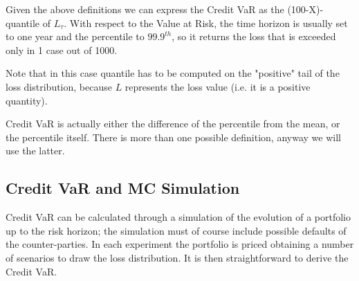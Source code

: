 Given the above definitions we can express the Credit VaR as the (100-X)-quantile of $L_{\tau}$. With respect to the Value at Risk, the time horizon is usually set to one year and the percentile to $99.9^{th}$, so it returns the loss that is exceeded only in 1 case out of 1000. 

Note that in this case quantile has to be computed on the "positive" tail of the loss distribution, because $L$ represents the loss value (i.e. it is a positive quantity).

Credit VaR is actually either the difference of the percentile from the mean, or the percentile itself. There is more than one possible definition, anyway we  will use the latter.

\subsection{Credit VaR and MC Simulation}
\label{sec:credit-var-sim}

Credit VaR can be calculated through a simulation of the evolution of a portfolio up to the risk horizon; the simulation must of course include possible defaults of the counter-parties. In each experiment the portfolio is priced obtaining a number of scenarios to draw the loss distribution. It is then straightforward to derive the Credit VaR.

